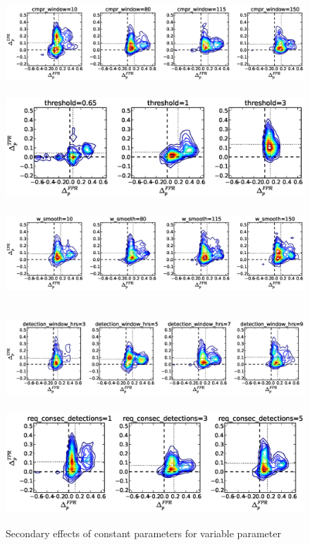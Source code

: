 \begin{figure}[!h]
\begin{center}
\includegraphics[height=1.5in]{../fig/final/delta_hist_sec/gamma/cmpr_window}
\includegraphics[height=1.5in]{../fig/final/delta_hist_sec/gamma/threshold}
\includegraphics[height=1.5in]{../fig/final/delta_hist_sec/gamma/w_smooth}
\includegraphics[height=1.5in]{../fig/final/delta_hist_sec/gamma/detection_window_hrs}
\includegraphics[height=1.5in]{../fig/final/delta_hist_sec/gamma/req_consec_detections}
\end{center}
\caption{\label{fig:delta_sec6} Secondary effects of constant parameters for variable parameter }
\end{figure}

